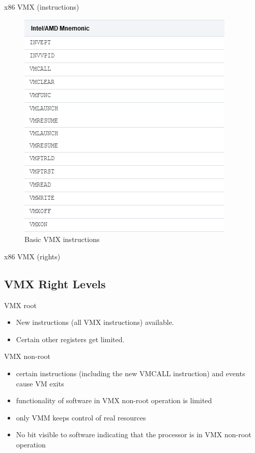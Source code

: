 \documentclass[11pt, aspectratio=169, modernfonts]{beamer}
\theoremstyle{definition}
\theoremstyle{remark}
\begin{document}
\begin{frame}{x86 VMX (instructions)
\cite{architecture64_sof_dev_manuel_vol_3}}
    \begin{figure}
        \centering
        \includegraphics[scale=0.4]{graphics/VMX_instructions.png}
        \caption{Basic VMX instructions \cite{vmx_instructions_oracle}}
        \label{fig:vmx_instructions}
    \end{figure}
\end{frame}

\begin{frame}{x86 VMX (rights)}
    \subsection{VMX Right Levels}
    \begin{block}{VMX root}
        \begin{itemize}
            \item New instructions (all VMX instructions) available.
            \item Certain other registers get limited.
        \end{itemize}
    \end{block}
    \begin{block}{VMX non-root}
        \begin{itemize}
            \item certain instructions (including the new VMCALL instruction) and events cause VM exits
            \item functionality of software in VMX non-root operation is limited
            \item only VMM keeps control of real resources
            \item No bit visible to software indicating that the processor is in VMX non-root operation
        \end{itemize}
    \end{block}
\end{frame}
\end{document}
